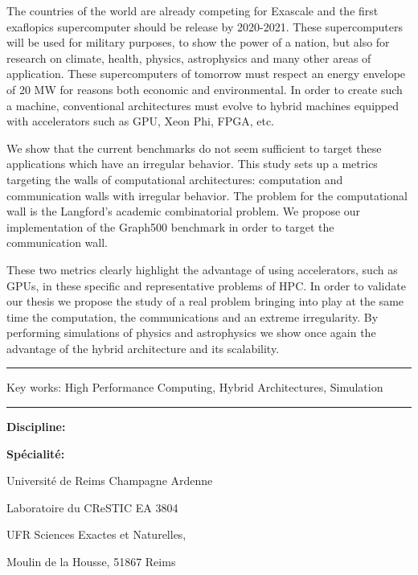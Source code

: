 The countries of the world are already competing for Exascale and the first exaflopics supercomputer should be release by 2020-2021.
These supercomputers will be used for military purposes, to show the power of a nation, but also for research on climate, health, physics, astrophysics and many other areas of application.
These supercomputers of tomorrow must respect an energy envelope of 20 MW for reasons both economic and environmental.
In order to create such a machine, conventional architectures must evolve to hybrid machines equipped with accelerators such as GPU, Xeon Phi, FPGA, etc.

We show that the current benchmarks do not seem sufficient to target these applications which have an irregular behavior.
This study sets up a metrics targeting the walls of computational architectures: computation and communication walls with irregular behavior.
The problem for the computational wall is the Langford's academic combinatorial problem.
We propose our implementation of the Graph500 benchmark in order to target the communication wall.

These two metrics clearly highlight the advantage of using accelerators, such as GPUs, in these specific and representative problems of HPC.
In order to validate our thesis we propose the study of a real problem bringing into play at the same time the computation, the communications and an extreme irregularity.
By performing simulations of physics and astrophysics we show once again the advantage of the hybrid architecture and its scalability.

\vspace{.5cm}
\hrule
\vspace{.2cm}

{
\small
Key works: High Performance Computing, Hybrid Architectures, Simulation
}

\vspace{.1cm}
\hrule

\vspace{.5cm}
\textbf{Discipline: \phdDiscipline}

\textbf{Spécialité: \phdSpeciality}
\vspace{.2cm}

\hspace{10cm}Université de Reims Champagne Ardenne

\hspace{10cm}Laboratoire du CReSTIC EA 3804

\hspace{10cm}UFR Sciences Exactes et Naturelles, 

\hspace{10cm}Moulin de la Housse, 51867 Reims

